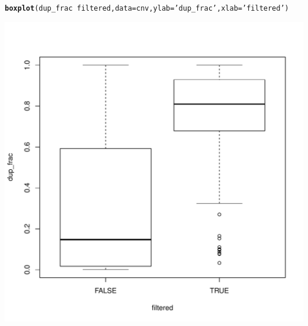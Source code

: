 \documentclass{article}\usepackage[]{graphicx}\usepackage[]{color}
\makeatletter
\def\maxwidth{ %
  \ifdim\Gin@nat@width>\linewidth
    \linewidth
  \else
    \Gin@nat@width
  \fi
}
\newcommand{\hlstr}[1]{\textcolor[rgb]{0.192,0.494,0.8}{#1}}%
\newcommand{\hlopt}[1]{\textcolor[rgb]{0,0,0}{#1}}%
\newcommand{\hlstd}[1]{\textcolor[rgb]{0.345,0.345,0.345}{#1}}%
\newcommand{\hlkwc}[1]{\textcolor[rgb]{0.333,0.667,0.333}{#1}}%
\newcommand{\hlkwd}[1]{\textcolor[rgb]{0.737,0.353,0.396}{\textbf{#1}}}%
\newenvironment{kframe}{%
 \def\at@end@of@kframe{}%
 \ifinner\ifhmode%
  \def\at@end@of@kframe{\end{minipage}}%
  \begin{minipage}{\columnwidth}%
 \fi\fi%
 \def\FrameCommand##1{\hskip\@totalleftmargin \hskip-\fboxsep
 \colorbox{shadecolor}{##1}\hskip-\fboxsep
     \hskip-\linewidth \hskip-\@totalleftmargin \hskip\columnwidth}%
 \MakeFramed {\advance\hsize-\width
   \@totalleftmargin\z@ \linewidth\hsize
   \@setminipage}}%
 {\par\unskip\endMakeFramed%
 \at@end@of@kframe}
\newenvironment{knitrout}{}{} %
\makeatother
\begin{document}
\begin{knitrout}\footnotesize
{}\color{fgcolor}\begin{kframe}
\begin{alltt}
\hlkwd{boxplot}\hlstd{(dup_frac} \hlopt{~} \hlstd{filtered,} \hlkwc{data}\hlstd{=cnv,}\hlkwc{ylab}\hlstd{=}\hlstr{'dup_frac'}\hlstd{,} \hlkwc{xlab}\hlstd{=}\hlstr{'filtered'}\hlstd{)}
\end{alltt}
\end{kframe}

{\centering \includegraphics[width=\maxwidth]{figs-knitr/unnamed-chunk-10-1} 

}



\end{knitrout}
\end{document}
